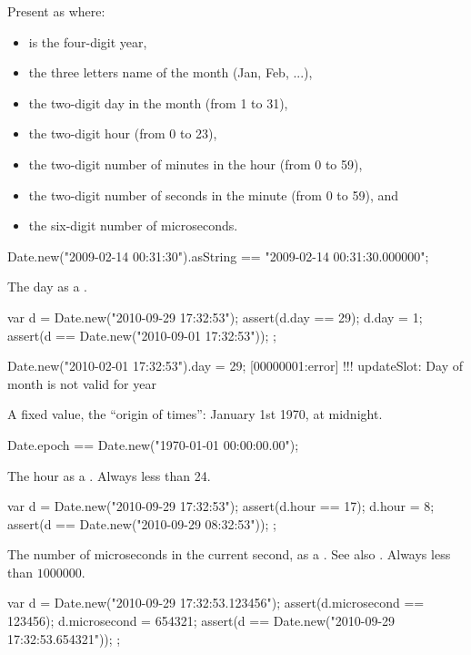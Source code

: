 \begin{urbiscriptapi}
\item[asString] Present as  where:
  \begin{itemize}
  \item {} is the four-digit year,
  \item {} the three letters name of the month (Jan, Feb, ...),
  \item {} the two-digit day in the month (from 1 to 31),
  \item {} the two-digit hour (from 0 to 23),
  \item {} the two-digit number of minutes in the hour (from 0 to 59),
  \item {} the two-digit number of seconds in the minute (from 0 to
    59), and
  \item {} the six-digit number of microseconds.
  \end{itemize}
\begin{urbiassert}
Date.new("2009-02-14 00:31:30").asString == "2009-02-14 00:31:30.000000";
\end{urbiassert}

\item[day]
  The day as a .
\begin{urbiscript}
{
  var d = Date.new("2010-09-29 17:32:53");
  assert(d.day == 29);
  d.day = 1;
  assert(d == Date.new("2010-09-01 17:32:53"));
};
\end{urbiscript}
\begin{urbiscript}
Date.new("2010-02-01 17:32:53").day = 29;
[00000001:error] !!! updateSlot: Day of month is not valid for year
\end{urbiscript}

\item[epoch]
  A fixed value, the ``origin of times'': January 1st 1970, at
  midnight.
\begin{urbiunchecked}
Date.epoch == Date.new("1970-01-01 00:00:00.00");
\end{urbiunchecked}

\item[hour]
  The hour as a .  Always less than 24.
\begin{urbiscript}
{
  var d = Date.new("2010-09-29 17:32:53");
  assert(d.hour == 17);
  d.hour = 8;
  assert(d == Date.new("2010-09-29 08:32:53"));
};
\end{urbiscript}

\item[microsecond]%
  The number of microseconds in the current second, as a .
  See also .  Always less than $1000 000$.
\begin{urbiscript}
{
  var d = Date.new("2010-09-29 17:32:53.123456");
  assert(d.microsecond == 123456);
  d.microsecond = 654321;
  assert(d == Date.new("2010-09-29 17:32:53.654321"));
};
\end{urbiscript}


\end{urbiscriptapi}

